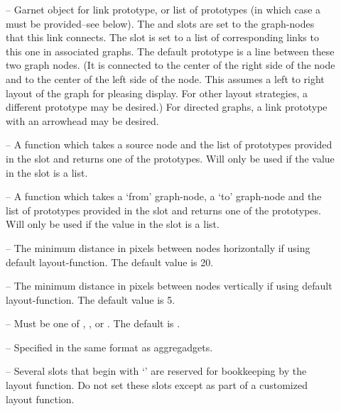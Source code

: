 \begin{description}
\item[]                  -- Garnet object for link prototype, or
list of prototypes (in which case a 
must be provided--see below).
                The  and  slots are set to the graph-nodes
                that this link connects.  The  slot is set to
a list of corresponding links to this one in associated
 graphs.  The default prototype is a
                line between these two graph nodes.  (It is connected
                to the center of the right side of the  node and
                to the center of the left side of the  node.  This
                assumes a left to right layout of the graph for
                pleasing display.  For other layout strategies, a
                different prototype may be desired.)  For directed
                graphs, a link prototype with an arrowhead may be desired.

\item[]  -- A function which takes a source node and the list
of prototypes provided in the  slot and returns one of the
prototypes.  Will only be used if the value in the  slot is a
list.

\item[]  -- A function which takes a `from' graph-node, a `to'
graph-node and the list of prototypes provided in the  slot and
returns one of the prototypes.  Will only be used if the value in the
 slot is a list.

\item[]                  -- The minimum distance in pixels
                between nodes horizontally if using default layout-function.
                The default value is 20.

\item[]                  -- The minimum distance in pixels
                between nodes vertically if using default layout-function.  The
                default value is 5.

\item[]  -- Must be one of , ,
or .  The default is .

\item[]                  -- Specified in the same format as
		aggregadgets.

\item[]  -- Several slots that begin with `'
are reserved for bookkeeping by the layout function.  Do not set these slots
except as part of a customized layout function.

\end{description}



